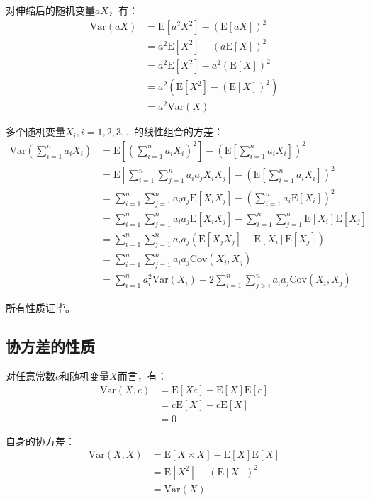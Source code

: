 \documentclass[UTF8]{ctexbook}
\begin{document}
对伸缩后的随机变量$aX$，有：
\begin{align*}
	\mathrm{Var}(aX)&=\mathrm E[a^2X^2]-\left(\mathrm{E}[aX]\right)^2 \\
	&=a^2\mathrm E[X^2]-\left(a\mathrm{E}[X]\right)^2 \\
	&=a^2\mathrm E[X^2]-a^2\left(\mathrm{E}[X]\right)^2 \\
	&=a^2(\mathrm E[X^2]-(\mathrm E[X])^2) \\
	&=a^2\mathrm{Var}(X)
\end{align*}

多个随机变量$X_i,i=1,2,3,\dots$的线性组合的方差：
\begin{align*}
	\mathrm{Var}\left(\sum_{i=1}^na_iX_i\right)&=\mathrm E\left[\left(\sum_{i=1}^na_iX_i\right)^2\right]-\left(\mathrm E\left[\sum_{i=1}^na_iX_i\right]\right)^2 \\
	&=\mathrm E\left[\sum_{i=1}^n\sum_{j=1}^na_ia_jX_iX_j\right]-\left(\mathrm E\left[\sum_{i=1}^na_iX_i\right]\right)^2 \\
	&=\sum_{i=1}^n\sum_{j=1}^na_ia_j\mathrm E[X_iX_j]-\left(\sum_{i=1}^na_i\mathrm E[X_i]\right)^2 \\
	&=\sum_{i=1}^n\sum_{j=1}^na_ia_j\mathrm E[X_iX_j]-\sum_{i=1}^n\sum_{j=1}^n\mathrm E[X_i]\mathrm E[X_j] \\
	&=\sum_{i=1}^n\sum_{j=1}^na_ia_j(\mathrm E[X_jX_j]-\mathrm E[X_i]\mathrm E[X_j]) \\
	&=\sum_{i=1}^n\sum_{j=1}^na_ia_j\mathrm{Cov}(X_i,X_j) \\
	&=\sum_{i=1}^na_i^2\mathrm{Var}(X_i)+2\sum_{i=1}^n\sum_{j>i}^na_ia_j\mathrm{Cov}(X_i,X_j)
\end{align*}

所有性质证毕。
\subsection{协方差的性质}
\label{covariance-proof}
对任意常数$c$和随机变量$X$而言，有：
\begin{align*}
	\mathrm{Var}(X,c)&=\mathrm E[Xc]-\mathrm E[X]\mathrm E[c] \\
	&=c\mathrm E[X]-c\mathrm E[X] \\
	&=0
\end{align*}

自身的协方差：
\begin{align*}
	\mathrm{Var}(X,X)&=\mathrm E[X\times X]-\mathrm E[X]\mathrm E[X] \\
	&=\mathrm E[X^2]-(\mathrm E[X])^2 \\
	&=\mathrm{Var}(X)
\end{align*}
\end{document}
